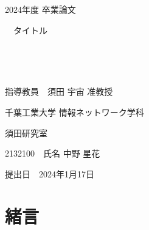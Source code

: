 \documentclass[12pt,a4j,titlepage]{ltjsarticle}
\begin{document}
\begin{titlepage}
  \begin{center}
  
    \vspace*{20truept}
    
    {\LARGE 2024年度 卒業論文} 
    
    \vspace*{75truept}
    
    {\Huge 　タイトル}　%

    \vspace{10truept}

    {\Huge }　%

    \vspace{10truept}

    {\Huge }　%

    \vspace{85truept}
    
    {\LARGE 指導教員　須田 宇宙 准教授}
    
    \vspace{60truept}
    
    {\LARGE 千葉工業大学 情報ネットワーク学科}
    
    \vspace{15truept}
    
    {\LARGE 須田研究室}
    
    \vspace{70truept}
    
    {\LARGE 2132100　氏名 中野 星花 }　%

    \vspace{70truept}
    
  \end{center}
  \begin{flushright}

    {\LARGE 提出日　2024年1月17日}
  
  \end{flushright}
\end{titlepage}

\setcounter{tocdepth}{3}
\tableofcontents
\listoftables
\listoffigures
\clearpage

\section{緒言}\label{緒言}


\end{document}
